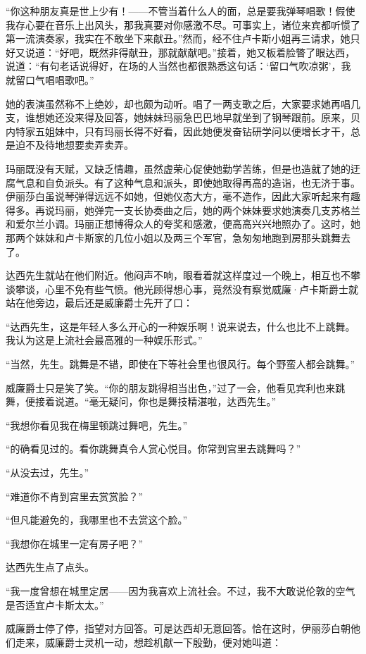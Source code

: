 \par “你这种朋友真是世上少有！——不管当着什么人的面，总是要我弹琴唱歌！假使我存心要在音乐上出风头，那我真要对你感激不尽。可事实上，诸位来宾都听惯了第一流演奏家，我实在不敢坐下来献丑。”然而，经不住卢卡斯小姐再三请求，她只好又说道：“好吧，既然非得献丑，那就献献吧。”接着，她又板着脸瞥了眼达西，说道：“有句老话说得好，在场的人当然也都很熟悉这句话：‘留口气吹凉粥’，我就留口气唱唱歌吧。”
\par 她的表演虽然称不上绝妙，却也颇为动听。唱了一两支歌之后，大家要求她再唱几支，谁想她还没来得及回答，她妹妹玛丽急巴巴地早就坐到了钢琴跟前。原来，贝内特家五姐妹中，只有玛丽长得不好看，因此她便发奋钻研学问以便增长才干，总是迫不及待地想要卖弄卖弄。
\par 玛丽既没有天赋，又缺乏情趣，虽然虚荣心促使她勤学苦练，但是也造就了她的迂腐气息和自负派头。有了这种气息和派头，即使她取得再高的造诣，也无济于事。伊丽莎白虽说琴弹得远远不如她，但她仪态大方，毫不造作，因此大家听起来有趣得多。再说玛丽，她弹完一支长协奏曲之后，她的两个妹妹要求她演奏几支苏格兰和爱尔兰小调。玛丽正想博得众人的夸奖和感激，便高高兴兴地照办了。这时，她那两个妹妹和卢卡斯家的几位小姐以及两三个军官，急匆匆地跑到房那头跳舞去了。
\par 达西先生就站在他们附近。他闷声不响，眼看着就这样度过一个晚上，相互也不攀谈攀谈，心里不免有些气愤。他光顾得想心事，竟然没有察觉威廉·卢卡斯爵士就站在他旁边，最后还是威廉爵士先开了口：
\par “达西先生，这是年轻人多么开心的一种娱乐啊！说来说去，什么也比不上跳舞。我认为这是上流社会最高雅的一种娱乐形式。”
\par “当然，先生。跳舞是不错，即使在下等社会里也很风行。每个野蛮人都会跳舞。”
\par 威廉爵士只是笑了笑。“你的朋友跳得相当出色，”过了一会，他看见宾利也来跳舞，便接着说道。“毫无疑问，你也是舞技精湛啦，达西先生。”
\par “我想你看见我在梅里顿跳过舞吧，先生。”
\par “的确看见过的。看你跳舞真令人赏心悦目。你常到宫里去跳舞吗？”
\par “从没去过，先生。”
\par “难道你不肯到宫里去赏赏脸？”
\par “但凡能避免的，我哪里也不去赏这个脸。”
\par “我想你在城里一定有房子吧？”
\par 达西先生点了点头。
\par “我一度曾想在城里定居——因为我喜欢上流社会。不过，我不大敢说伦敦的空气是否适宜卢卡斯太太。”
\par 威廉爵士停了停，指望对方回答。可是达西却无意回答。恰在这时，伊丽莎白朝他们走来，威廉爵士灵机一动，想趁机献一下殷勤，便对她叫道：
